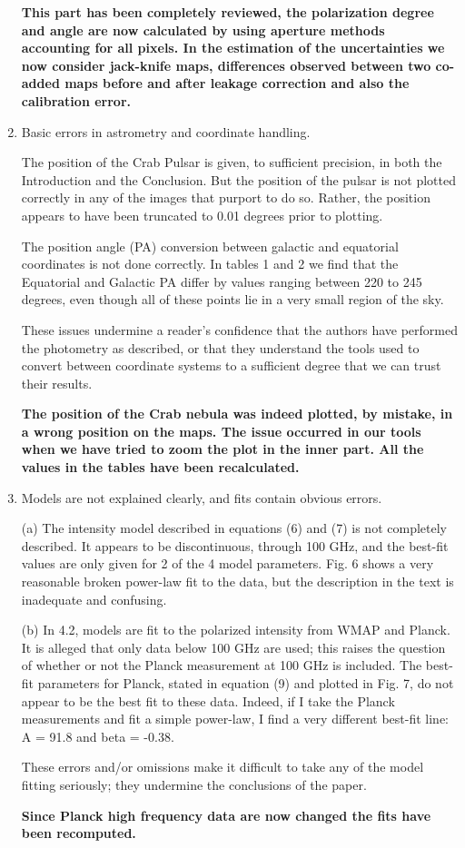 \documentclass[12pt]{article}
\begin{document}
\begin{enumerate}
\textbf{This part has been completely reviewed, the polarization degree and angle are now calculated by using aperture methods accounting for all pixels. In the estimation of the uncertainties we now consider jack-knife maps, differences observed between two co-added maps before and after leakage correction and also the calibration error.}

\item  Basic errors in astrometry and coordinate handling.

The position of the Crab Pulsar is given, to sufficient precision, in
both the Introduction and the Conclusion. But the position of the
pulsar is not plotted correctly in any of the images that purport to
do so. Rather, the position appears to have been truncated to 0.01
degrees prior to plotting.

The position angle (PA) conversion between galactic and equatorial
coordinates is not done correctly. In tables 1 and 2 we find that the
Equatorial and Galactic PA differ by values ranging between 220 to 245
degrees, even though all of these points lie in a very small region of
the sky.

These issues undermine a reader's confidence that the authors have
performed the photometry as described, or that they understand the
tools used to convert between coordinate systems to a sufficient
degree that we can trust their results.

\textbf{The position of the Crab nebula was indeed plotted, by mistake, in a wrong position on the maps. The issue occurred in our tools when we have tried to zoom the plot in the inner part. All the values in the tables have been recalculated.}

\item Models are not explained clearly, and fits contain obvious errors.

(a) The intensity model described in equations (6) and (7) is not
completely described. It appears to be discontinuous, through 100
GHz, and the best-fit values are only given for 2 of the 4 model
parameters. Fig. 6 shows a very reasonable broken power-law fit to
the data, but the description in the text is inadequate and confusing.

(b) In 4.2, models are fit to the polarized intensity from WMAP and
Planck. It is alleged that only data below 100 GHz are used; this
raises the question of whether or not the Planck measurement at 100
GHz is included. The best-fit parameters for Planck, stated in
equation (9) and plotted in Fig. 7, do not appear to be the best fit
to these data. Indeed, if I take the Planck measurements and fit a
simple power-law, I find a very different best-fit line: A = 91.8 and
beta = -0.38.

These errors and/or omissions make it difficult to take any of the
model fitting seriously; they undermine the conclusions of the paper.

\textbf{Since Planck high frequency data are now changed the fits have been recomputed.}

\end{enumerate}
\end{document}
